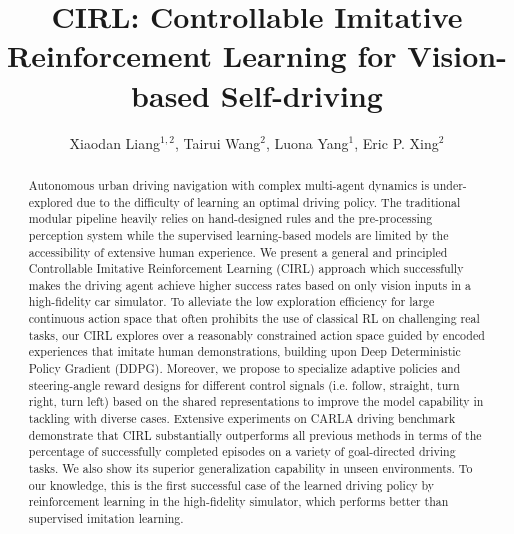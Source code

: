 \documentclass[runningheads]{llncs}
\begin{document}
\pagestyle{headings}
\mainmatter
\def\ECCV18SubNumber{559}  %

\title{CIRL: Controllable Imitative Reinforcement Learning for Vision-based Self-driving} %





\author{Xiaodan Liang$^{1,2}$, Tairui Wang$^{2}$, Luona Yang$^{1}$, Eric P. Xing$^{2}$}




\maketitle

\begin{abstract}
Autonomous urban driving navigation with complex multi-agent dynamics is under-explored due to the difficulty of learning an optimal driving policy. The traditional modular pipeline heavily relies on hand-designed rules and the pre-processing perception system while the supervised learning-based models are limited by the accessibility of extensive human experience. We present a general and principled Controllable Imitative Reinforcement Learning (CIRL) approach which successfully makes the driving agent achieve higher success rates based on only vision inputs in a high-fidelity car simulator. To alleviate the low exploration efficiency for large continuous action space that often prohibits the use of classical RL on challenging real tasks, our CIRL explores over a reasonably constrained action space guided by encoded experiences that imitate human demonstrations,  building upon Deep Deterministic Policy Gradient (DDPG). Moreover, we propose to specialize adaptive policies and steering-angle reward designs for different control signals (i.e. follow, straight, turn right, turn left) based on the shared representations to improve the model capability in tackling with diverse cases. Extensive experiments on CARLA driving benchmark demonstrate that CIRL substantially outperforms all previous methods in terms of the percentage of successfully completed episodes on a variety of goal-directed driving tasks. We also show its superior generalization capability in unseen environments. To our knowledge, this is the first successful case of the learned driving policy by reinforcement learning in the high-fidelity simulator, which performs better than supervised imitation learning.



\end{abstract}
\end{document}
